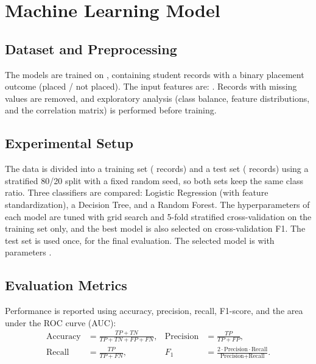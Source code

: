 \section{Machine Learning Model}

\subsection{Dataset and Preprocessing}
The models are trained on \mlDataset{}, containing \mlNTotal{} student records with a binary placement outcome (placed / not placed). The input features are: \mlFeatures. Records with missing values are removed, and exploratory analysis (class balance, feature distributions, and the correlation matrix) is performed before training.

\subsection{Experimental Setup}
The data is divided into a training set (\mlNTrain{} records) and a test set (\mlNTest{} records) using a stratified 80/20 split with a fixed random seed, so both sets keep the same class ratio. Three classifiers are compared: Logistic Regression (with feature standardization), a Decision Tree, and a Random Forest. The hyperparameters of each model are tuned with grid search and 5-fold stratified cross-validation on the training set only, and the best model is also selected on cross-validation F1. The test set is used once, for the final evaluation. The selected model is \mlBest{} with parameters \mlBestParams.

\subsection{Evaluation Metrics}
Performance is reported using accuracy, precision, recall, F1-score, and the area under the ROC curve (AUC):
\begin{align}
\text{Accuracy} &= \frac{TP+TN}{TP+TN+FP+FN}, &
\text{Precision} &= \frac{TP}{TP+FP},\\
\text{Recall} &= \frac{TP}{TP+FN}, &
F_1 &= \frac{2\cdot \text{Precision}\cdot\text{Recall}}{\text{Precision}+\text{Recall}}.
\end{align}

